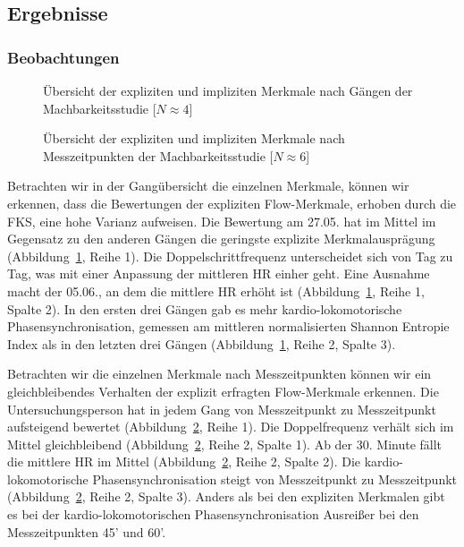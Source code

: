 \subsection{Ergebnisse} 

\label{sub:ergebnisse_5_2}

\subsubsection{Beobachtungen} 

\label{ssub:beobachtungen_5_2} 
\begin{figure}
	[!htb]  \caption[Übersicht der expliziten und impliziten Merkmale nach Gängen (Machbarkeitsstudie: Gehen)]{Übersicht der expliziten und impliziten Merkmale nach Gängen der Machbarkeitsstudie [$N \approx 4$]} \label{fig:ubersicht_nach_gangen_2} 
\end{figure}
\begin{figure}
	[!htb]  \caption[Übersicht der expliziten und impliziten Merkmale nach Messzeitpunkten (Machbarkeitsstudie: Gehen)]{Übersicht der expliziten und impliziten Merkmale nach Messzeitpunkten der Machbarkeitsstudie [$N \approx 6$]} \label{fig:ubersicht_nach_messzeitpunkten_2} 
\end{figure}

Betrachten wir in der Gangübersicht die einzelnen Merkmale, können wir erkennen, dass die Bewertungen der expliziten Flow-Merkmale, erhoben durch die \ac{FKS}, eine hohe Varianz aufweisen. Die Bewertung am 27.05. hat im Mittel im Gegensatz zu den anderen Gängen die geringste explizite Merkmalausprägung (Abbildung~\ref{fig:ubersicht_nach_gangen_2}, Reihe 1). Die Doppelschrittfrequenz unterscheidet sich von Tag zu Tag, was mit einer Anpassung der mittleren \ac{HR} einher geht. Eine Ausnahme macht der 05.06., an dem die mittlere \ac{HR} erhöht ist (Abbildung~\ref{fig:ubersicht_nach_gangen_2}, Reihe 1, Spalte 2). In den ersten drei Gängen gab es mehr kardio-lokomotorische Phasensynchronisation, gemessen am mittleren normalisierten Shannon Entropie Index als in den letzten drei Gängen (Abbildung~\ref{fig:ubersicht_nach_gangen_2}, Reihe 2, Spalte 3).

Betrachten wir die einzelnen Merkmale nach Messzeitpunkten können wir ein gleichbleibendes Verhalten der explizit erfragten Flow-Merkmale erkennen. Die Untersuchungsperson hat in jedem Gang von Messzeitpunkt zu Messzeitpunkt aufsteigend bewertet (Abbildung~\ref{fig:ubersicht_nach_messzeitpunkten_2}, Reihe 1). Die Doppelfrequenz verhält sich im Mittel gleichbleibend (Abbildung~\ref{fig:ubersicht_nach_messzeitpunkten_2}, Reihe 2, Spalte 1). Ab der 30. Minute fällt die mittlere \ac{HR} im Mittel (Abbildung~\ref{fig:ubersicht_nach_messzeitpunkten_2}, Reihe 2, Spalte 2). Die kardio-lokomotorische Phasensynchronisation steigt von Messzeitpunkt zu Messzeitpunkt (Abbildung~\ref{fig:ubersicht_nach_messzeitpunkten_2}, Reihe 2, Spalte 3). Anders als bei den expliziten Merkmalen gibt es bei der kardio-lokomotorischen Phasensynchronisation Ausreißer bei den Messzeitpunkten 45' und 60'. 

